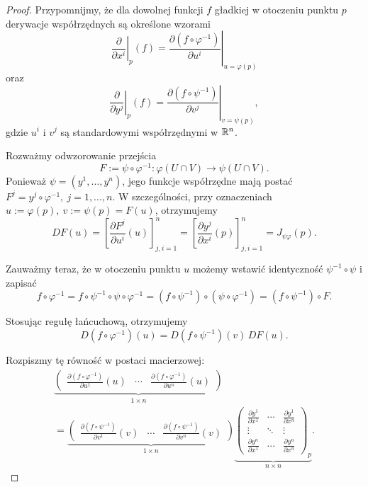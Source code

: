 \begin{proof}
Przypomnijmy, że dla dowolnej funkcji $f$ gładkiej
w otoczeniu punktu $p$ derywacje współrzędnych
są określone wzorami
\[
\left.\frac{\partial}{\partial x^i}\right|_p(f)
=
\left.
\frac{\partial(f\circ\varphi^{-1})}{\partial u^i}
\right|_{u=\varphi(p)}
\]
oraz
\[
\left.\frac{\partial}{\partial y^j}\right|_p(f)
=
\left.
\frac{\partial(f\circ\psi^{-1})}{\partial v^j}
\right|_{v=\psi(p)},
\]
gdzie $u^i$ i $v^j$ są standardowymi współrzędnymi
w $\mathbb{R}^n$.

Rozważmy odwzorowanie przejścia
\[
F:=\psi\circ\varphi^{-1}
\colon
\varphi(U\cap V)\longrightarrow\psi(U\cap V).
\]
Ponieważ $\psi=(y^1,\ldots,y^n)$,
jego funkcje współrzędne mają postać $F^j=y^j\circ\varphi^{-1}, \ j=1,\ldots,n$.
W szczególności, przy oznaczeniach $u:=\varphi(p), \ v:=\psi(p)=F(u)$,
otrzymujemy
\[
DF(u)
=
\left[
\frac{\partial F^j}{\partial u^i}(u)
\right]_{j,i=1}^n
=
\left[
\frac{\partial y^j}{\partial x^i}(p)
\right]_{j,i=1}^n
=
J_{\psi\varphi}(p).
\]

Zauważmy teraz, że w otoczeniu punktu $u$
możemy wstawić identyczność
$\psi^{-1}\circ\psi$ i zapisać
\[
f\circ\varphi^{-1}
=f\circ\psi^{-1}\circ\psi\circ\varphi^{-1}
=(f\circ\psi^{-1})\circ(\psi\circ\varphi^{-1})
=(f\circ\psi^{-1})\circ F.
\]

Stosując regułę łańcuchową, otrzymujemy
\[
\boxed{
D(f\circ\varphi^{-1})(u)
=
D(f\circ\psi^{-1})(v)\,DF(u).
}
\]

Rozpiszmy tę równość w postaci macierzowej:
\[
\begin{gathered}
\underbrace{
\begin{pmatrix}
\displaystyle
\frac{\partial(f\circ\varphi^{-1})}{\partial u^1}(u)
&
\cdots
&
\displaystyle
\frac{\partial(f\circ\varphi^{-1})}{\partial u^n}(u)
\end{pmatrix}
}_{1\times n}
\\[1mm]
=
\underbrace{
\begin{pmatrix}
\displaystyle
\frac{\partial(f\circ\psi^{-1})}{\partial v^1}(v)
&
\cdots
&
\displaystyle
\frac{\partial(f\circ\psi^{-1})}{\partial v^n}(v)
\end{pmatrix}
}_{1\times n}
\underbrace{
\begin{pmatrix}
\displaystyle\frac{\partial y^1}{\partial x^1}
&\cdots&
\displaystyle\frac{\partial y^1}{\partial x^n}
\\[2mm]
\vdots&\ddots&\vdots
\\[2mm]
\displaystyle\frac{\partial y^n}{\partial x^1}
&\cdots&
\displaystyle\frac{\partial y^n}{\partial x^n}
\end{pmatrix}_{\!p}
}_{n\times n}.
\end{gathered}
\]


\end{proof}
